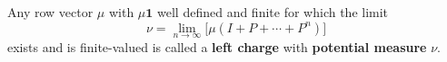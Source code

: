 Any row vector $\mu$ with $\mu \mathbf{1}$ well defined and finite for which the limit
$$\nu = \lim_{n \to \infty} \bigl[ \mu(I + P + \cdots + P^n) \bigr]$$
exists and is finite-valued is called a \textbf{left charge} with \textbf{potential measure} $\nu$.
